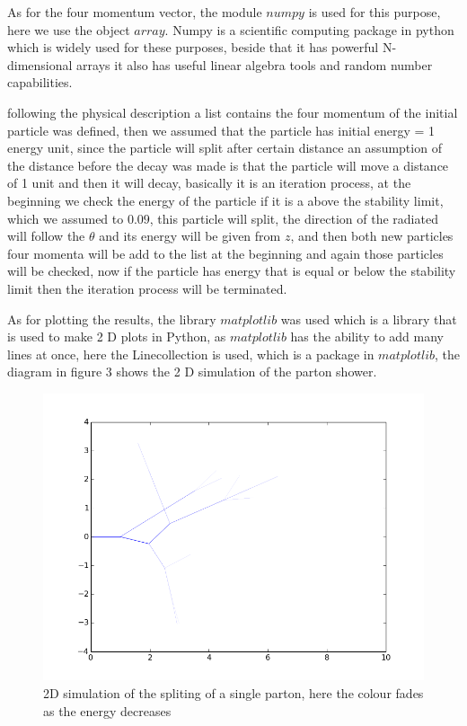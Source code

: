 \documentclass[12pt,a4paper]{article}
\begin{document}
As for the four momentum vector, the module $numpy$ is used for this purpose, here we use the object $array$. Numpy is a scientific computing package in python which is widely used for these purposes, beside that it has powerful N-dimensional arrays it also has useful linear algebra tools and random number capabilities.         

following the physical description a list contains the four momentum of the initial particle was defined, then we assumed that the particle has initial energy = 1 energy unit, since the particle will split after certain distance an assumption of the distance before the decay was made is that the particle will move a distance of 1 unit and then it will decay, basically it is an iteration process,  at the beginning we check the energy of the particle if it is a above the stability limit, which we assumed to $0.09$, this particle will split, the direction of the radiated will follow the $\theta$ and its energy will be given from $z$, and then both new particles four momenta will be add to the list at the beginning and again those particles will be checked, now if the particle has energy that is equal or below the stability limit then the iteration process will be terminated.   

As for plotting the results, the library $matplotlib$ was used which is a library that is used to make 2 D plots in Python, as $matplotlib$ has the ability to add many lines at once, here the Linecollection is used, which is a package in $matplotlib$, the diagram in figure 3 shows the 2 D simulation of the parton shower.  \begin{figure}[H]
\centering
\includegraphics[scale=.5]{2D_partonshower.png}
\caption{2D simulation of the spliting of a single parton, here the colour fades as the energy decreases}
\end{figure}
\end{document}
